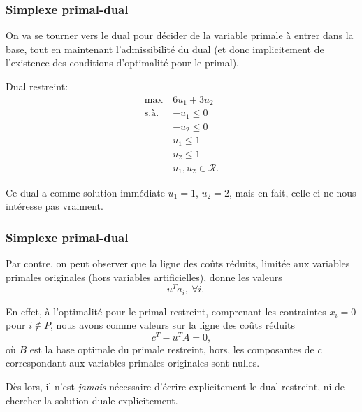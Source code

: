 \documentclass[t,usepdftitle=false]{beamer}
\begin{document}
\begin{frame}
\frametitle{Simplexe primal-dual}

On va se tourner vers le dual pour décider de la variable primale à entrer dans la base, tout en maintenant l'admissibilité du dual (et donc implicitement de l'existence des conditions d'optimalité pour le primal).

\mbox{}

Dual restreint:
\begin{align*}
\max\ & 6u_1 + 3u_2 \\
\mbox{s.à. } & -u_1 \leq 0 \\
& -u_2 \leq 0 \\
& u_1 \leq 1 \\
& u_2 \leq 1 \\
& u_1, u_2 \in \mathcal{R}.
\end{align*}

\mbox{}

Ce dual a comme solution immédiate $u_1 = 1$, $u_2 = 2$, mais en fait, celle-ci ne nous intéresse pas vraiment.

\end{frame}

\begin{frame}
\frametitle{Simplexe primal-dual}

Par contre, on peut observer que la ligne des coûts réduits, limitée aux variables primales originales (hors variables artificielles), donne les valeurs
\[
-u^Ta_i, \ \forall i.
\]

\mbox{}

En effet, à l'optimalité pour le primal restreint, comprenant les contraintes $x_i = 0$ pour $i \notin P$, nous avons comme valeurs sur la ligne des coûts réduits
\[
c^T - u^T A = 0,
\]
où $B$ est la base optimale du primale restreint, hors, les composantes de $c$ correspondant aux variables primales originales sont nulles.

\mbox{}

Dès lors, il n'est \emph{jamais} nécessaire d'écrire explicitement le dual restreint, ni de chercher la solution duale explicitement.

\end{frame}
\end{document}
